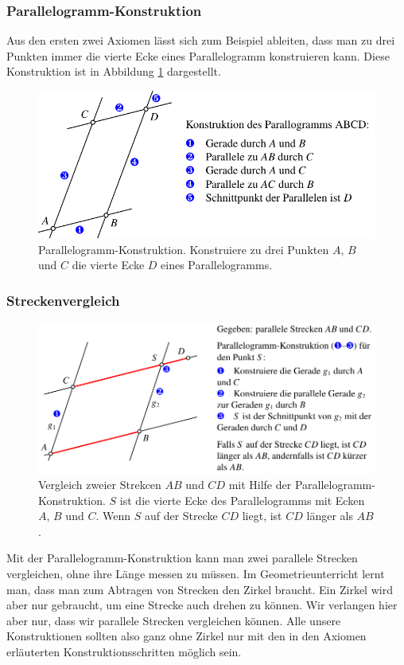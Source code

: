 \subsubsection{Parallelogramm-Konstruktion}
Aus den ersten zwei Axiomen lässt sich zum Beispiel ableiten, dass
man zu drei Punkten immer die vierte Ecke eines Parallelogramm
konstruieren kann.
Diese Konstruktion ist in Abbildung \ref{skript:affin:parallelogramm}
dargestellt.
\begin{figure}
\centering
\includegraphics{3/images/parallelogramm.pdf}
\caption{Parallelogramm-Konstruktion. Konstruiere zu drei Punkten
$A$, $B$ und $C$ die vierte Ecke $D$ eines Parallelogramms.
\label{skript:affin:parallelogramm}}
\end{figure}

\subsubsection{Streckenvergleich}
\begin{figure}
\centering
\includegraphics{3/images/streckenvergleich.pdf}
\caption{Vergleich zweier Strekcen $AB$ und $CD$ mit Hilfe der
Parallelogramm-Konstruktion. 
$S$ ist die vierte Ecke des Parallelogramms mit Ecken $A$, $B$ und $C$.
Wenn $S$ auf der Strecke $CD$ liegt, ist $CD$ länger als $AB$.
\label{skript:streckenvergleich}}
\end{figure}
Mit der Parallelogramm-Konstruktion kann man zwei parallele Strecken
vergleichen, ohne ihre Länge messen zu müssen.
Im Geometrieunterricht lernt man, dass man zum Abtragen von Strecken
den Zirkel braucht.
Ein Zirkel wird aber nur gebraucht, um eine Strecke auch drehen zu
können.
Wir verlangen hier aber nur, dass wir parallele Strecken vergleichen
können.
Alle unsere Konstruktionen sollten also ganz ohne Zirkel nur mit den
in den Axiomen erläuterten Konstruktionsschritten möglich sein.

